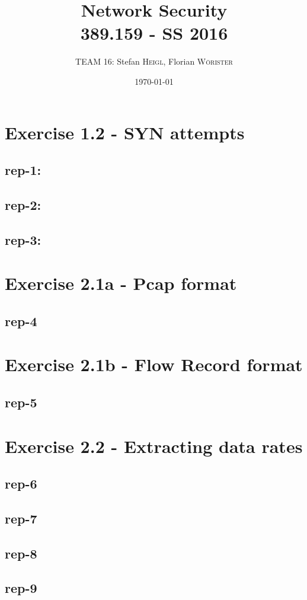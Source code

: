\documentclass{article}
\title{Network Security \\ 389.159 - SS 2016} %
\author{TEAM 16: Stefan \textsc{Heigl}, Florian \textsc{W\"{o}rister}} %
\date{\today} %
\begin{document}
\maketitle %

\section*{Exercise 1.2 - SYN attempts}
\subsection*{rep-1:}
\subsection*{rep-2:}
\subsection*{rep-3:}

\section*{Exercise 2.1a - Pcap format}
\subsection*{rep-4}

\section*{Exercise 2.1b - Flow Record format}
\subsection*{rep-5}

\section*{Exercise 2.2 - Extracting data rates}
\subsection*{rep-6}
\subsection*{rep-7}
\subsection*{rep-8}
\subsection*{rep-9}
\end{document}
